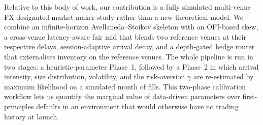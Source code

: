 Relative to this body of work, our contribution is a fully simulated
multi-venue FX designated-market-maker study rather than a new theoretical
model. We combine an infinite-horizon Avellaneda--Stoikov skeleton with an
OFI-based skew, a cross-venue latency-aware fair mid that blends two
reference venues at their respective delays, session-adaptive arrival
decay, and a depth-gated hedge router that externalises inventory on the
reference venues. The whole pipeline is run in two stages: a
heuristic-parameter Phase~1, followed by a Phase~2 in which arrival
intensity, size distribution, volatility, and the risk-aversion $\gamma$
are re-estimated by maximum likelihood on a simulated month of fills.
This two-phase calibration workflow lets us quantify the marginal value
of data-driven parameters over first-principles defaults in an
environment that would otherwise have no trading history at launch.
